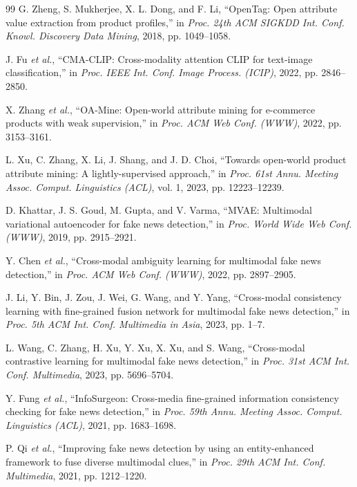 \documentclass[conference,10pt]{IEEEtran}
\begin{document}
\begin{thebibliography}{99}
G. Zheng, S. Mukherjee, X. L. Dong, and F. Li, ``OpenTag: Open attribute value extraction from product profiles,'' in \textit{Proc. 24th ACM SIGKDD Int. Conf. Knowl. Discovery Data Mining}, 2018, pp. 1049--1058.

J. Fu \textit{et al.}, ``CMA-CLIP: Cross-modality attention CLIP for text-image classification,'' in \textit{Proc. IEEE Int. Conf. Image Process. (ICIP)}, 2022, pp. 2846--2850.

X. Zhang \textit{et al.}, ``OA-Mine: Open-world attribute mining for e-commerce products with weak supervision,'' in \textit{Proc. ACM Web Conf. (WWW)}, 2022, pp. 3153--3161.

L. Xu, C. Zhang, X. Li, J. Shang, and J. D. Choi, ``Towards open-world product attribute mining: A lightly-supervised approach,'' in \textit{Proc. 61st Annu. Meeting Assoc. Comput. Linguistics (ACL)}, vol. 1, 2023, pp. 12223--12239.

D. Khattar, J. S. Goud, M. Gupta, and V. Varma, ``MVAE: Multimodal variational autoencoder for fake news detection,'' in \textit{Proc. World Wide Web Conf. (WWW)}, 2019, pp. 2915--2921.

Y. Chen \textit{et al.}, ``Cross-modal ambiguity learning for multimodal fake news detection,'' in \textit{Proc. ACM Web Conf. (WWW)}, 2022, pp. 2897--2905.

J. Li, Y. Bin, J. Zou, J. Wei, G. Wang, and Y. Yang, ``Cross-modal consistency learning with fine-grained fusion network for multimodal fake news detection,'' in \textit{Proc. 5th ACM Int. Conf. Multimedia in Asia}, 2023, pp. 1--7.

L. Wang, C. Zhang, H. Xu, Y. Xu, X. Xu, and S. Wang, ``Cross-modal contrastive learning for multimodal fake news detection,'' in \textit{Proc. 31st ACM Int. Conf. Multimedia}, 2023, pp. 5696--5704.

Y. Fung \textit{et al.}, ``InfoSurgeon: Cross-media fine-grained information consistency checking for fake news detection,'' in \textit{Proc. 59th Annu. Meeting Assoc. Comput. Linguistics (ACL)}, 2021, pp. 1683--1698.

P. Qi \textit{et al.}, ``Improving fake news detection by using an entity-enhanced framework to fuse diverse multimodal clues,'' in \textit{Proc. 29th ACM Int. Conf. Multimedia}, 2021, pp. 1212--1220.


\end{thebibliography}
\end{document}

